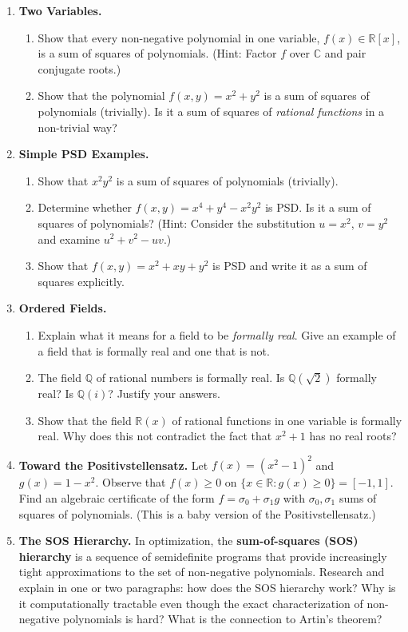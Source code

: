 \begin{enumerate}
    \item \textbf{Two Variables.}
    \begin{enumerate}
        \item Show that every non-negative polynomial in one variable, $f(x) \in \mathbb{R}[x]$, is a sum of squares of polynomials. (Hint: Factor $f$ over $\mathbb{C}$ and pair conjugate roots.)
        \item Show that the polynomial $f(x,y) = x^2 + y^2$ is a sum of squares of polynomials (trivially). Is it a sum of squares of \emph{rational functions} in a non-trivial way?
    \end{enumerate}

    \item \textbf{Simple PSD Examples.}
    \begin{enumerate}
        \item Show that $x^2 y^2$ is a sum of squares of polynomials (trivially).
        \item Determine whether $f(x,y) = x^4 + y^4 - x^2 y^2$ is PSD. Is it a sum of squares of polynomials? (Hint: Consider the substitution $u = x^2$, $v = y^2$ and examine $u^2 + v^2 - uv$.)
        \item Show that $f(x,y) = x^2 + xy + y^2$ is PSD and write it as a sum of squares explicitly.
    \end{enumerate}

    \item \textbf{Ordered Fields.}
    \begin{enumerate}
        \item Explain what it means for a field to be \emph{formally real}. Give an example of a field that is formally real and one that is not.
        \item The field $\mathbb{Q}$ of rational numbers is formally real. Is $\mathbb{Q}(\sqrt{2})$ formally real? Is $\mathbb{Q}(i)$? Justify your answers.
        \item Show that the field $\mathbb{R}(x)$ of rational functions in one variable is formally real. Why does this not contradict the fact that $x^2+1$ has no real roots?
    \end{enumerate}

    \item \textbf{Toward the Positivstellensatz.} Let $f(x) = (x^2-1)^2$ and $g(x) = 1-x^2$. Observe that $f(x) \geq 0$ on $\{x \in \mathbb{R} : g(x) \geq 0\} = [-1,1]$. Find an algebraic certificate of the form $f = \sigma_0 + \sigma_1 g$ with $\sigma_0, \sigma_1$ sums of squares of polynomials. (This is a baby version of the Positivstellensatz.)

    \item[$\star$] \textbf{The SOS Hierarchy.} In optimization, the \textbf{sum-of-squares (SOS) hierarchy} is a sequence of semidefinite programs that provide increasingly tight approximations to the set of non-negative polynomials. Research and explain in one or two paragraphs: how does the SOS hierarchy work? Why is it computationally tractable even though the exact characterization of non-negative polynomials is hard? What is the connection to Artin's theorem?

\end{enumerate}
